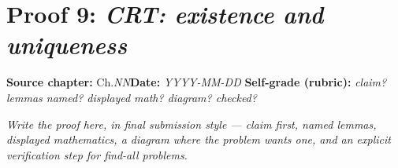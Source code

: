 \documentclass[11pt]{article}
\begin{document}
\section*{Proof 9: \emph{CRT: existence and uniqueness}}
\textbf{Source chapter:} Ch.\emph{NN}\quad \textbf{Date:} \emph{YYYY-MM-DD}\quad
\textbf{Self-grade (rubric):} \emph{claim? lemmas named? displayed math? diagram? checked?}
\medskip

\emph{Write the proof here, in final submission style — claim first, named lemmas,
displayed mathematics, a diagram where the problem wants one, and an explicit
verification step for find-all problems.}
\end{document}
